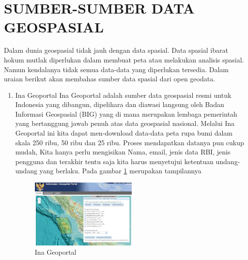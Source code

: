 \section{SUMBER-SUMBER DATA GEOSPASIAL}

Dalam dunia geospasial tidak jauh dengan data spasial. Data spasial ibarat hokum mutlak diperlukan dalam membuat peta atau melakukan analisis spasial. Namun kendalanya tidak semua data-data yang diperlukan tersedia. Dalam uraian berikut akan membahas sumber data spasial dari open geodata.
\begin{enumerate}
\item Ina Geoportal
Ina Geoportal adalah sumber data geospasial resmi untuk Indonesia yang  dibangun, dipelihara dan diawasi langsung oleh Badan Informasi Geospasial (BIG) yang di mana merupakan lembaga pemerintah yang bertanggung jawab penuh atas data geospasial nasional. Melalui Ina Geoportal ini kita dapat men-download data-data peta rupa bumi dalam skala 250 ribu, 50 ribu dan 25 ribu. Proses mendapatkan datanya pun cukup mudah, Kita hanya perlu mengisikan Nama, email, jenis data RBI, jenis pengguna dan terakhir tentu saja kita harus menyetujui ketentuan undang-undang yang berlaku. Pada gambar \ref{labelgambar1} merupakan tampilannya  
\begin{figure}[ht]
\centering
\includegraphics[width=0.5\textwidth]{pictures/ina_geospasial}
\caption{Ina Geoportal}
\label{labelgambar1}
\end{figure}


\end{enumerate}

